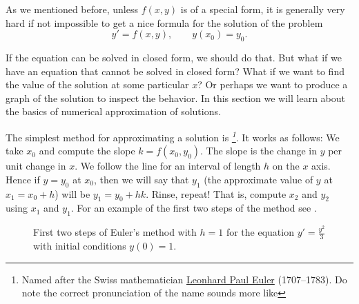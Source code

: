 \documentclass[12pt]{book}
\begin{document}

%


As we mentioned before, unless $f(x,y)$ is of a special form,
it is generally very hard
if not impossible to get a nice formula for the solution of the problem
\begin{equation*}
y' = f(x,y), \qquad y(x_0) = y_0 .
\end{equation*}

If the equation can be solved in closed form, we should do that.
But what if we have an equation that cannot be solved in closed form?
What if we want to find the value of the solution at some particular $x$?
Or perhaps we want to produce a graph of the solution to inspect the
behavior.  In this section we will learn about the basics of numerical
approximation of solutions.

The simplest method for approximating a solution is
\emph{%
\footnote{Named after the Swiss mathematician
\href{http://en.wikipedia.org/wiki/Euler}{Leonhard Paul Euler}
(1707--1783).  Do note the correct pronunciation of the name sounds more
like }}.  It works as follows:
We take $x_0$ and compute the slope $k = f(x_0,y_0)$.  The slope is the
change in $y$ per unit change in $x$.  We follow the line for an interval of
length $h$ on the $x$ axis.  Hence if $y = y_0$ at $x_0$, then we will say that
$y_1$ (the approximate value of $y$ at $x_1 = x_0 + h$) will be
$y_1 = y_0 + h k$.
Rinse, repeat!  That is, compute $x_2$ and $y_2$ using $x_1$ and $y_1$.
For an example of the first two steps of the method see
.

\begin{figure}[h!t]
\capstart
\begin{center}
\qquad
{}
\caption{First two steps of Euler's method with $h=1$ for
the equation $y' = \frac{y^2}{3}$ with initial conditions $y(0)=1$.%
\label{euler-step12:fig}}
\end{center}
\end{figure}
\end{document}
